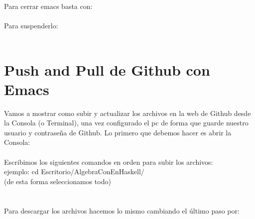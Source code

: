 Para cerrar emacs basta con:\\
\\

Para suspenderlo:\\
\\

\chapter{Push and Pull de Github con Emacs}\label{aped.C}

Vamos a mostrar como subir y actualizar los archivos en la web de Github desde la Consola (o Terminal), una vez configurado el pc de forma que guarde nuestro usuario y contraseña de Github. Lo primero que debemos hacer es abrir la Consola:\\

\\

Escribimos los siguientes comandos en orden para subir los archivos:\\

 ejemplo: cd Escritorio/AlgebraConEnHaskell/ \\

 (de esta forma seleccionamos todo)\\

\\

\\


Para descargar los archivos hacemos lo mismo cambiando el último paso por:\\

\\


